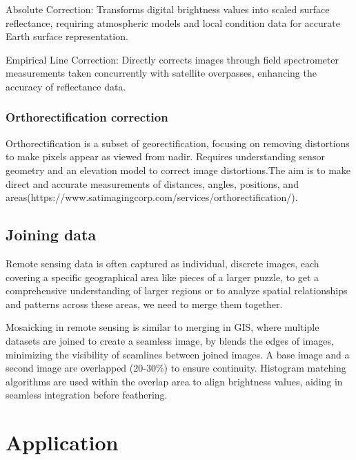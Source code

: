 \documentclass[
  letterpaper,
  DIV=11,
  numbers=noendperiod]{scrreprt}
\begin{document}
Absolute Correction: Transforms digital brightness values into scaled
surface reflectance, requiring atmospheric models and local condition
data for accurate Earth surface representation.

Empirical Line Correction: Directly corrects images through field
spectrometer measurements taken concurrently with satellite overpasses,
enhancing the accuracy of reflectance data.

\subsection{Orthorectification
correction}\label{orthorectification-correction}

Orthorectification is a subset of georectification, focusing on removing
distortions to make pixels appear as viewed from nadir. Requires
understanding sensor geometry and an elevation model to correct image
distortions.The aim is to make direct and accurate measurements of
distances, angles, positions, and
areas(https://www.satimagingcorp.com/services/orthorectification/).

\section{Joining data}\label{joining-data}

Remote sensing data is often captured as individual, discrete images,
each covering a specific geographical area like pieces of a larger
puzzle, to get a comprehensive understanding of larger regions or to
analyze spatial relationships and patterns across these areas, we need
to merge them together.

Mosaicking in remote sensing is similar to merging in GIS, where
multiple datasets are joined to create a seamless image, by blends the
edges of images, minimizing the visibility of seamlines between joined
images. A base image and a second image are overlapped (20-30\%) to
ensure continuity. Histogram matching algorithms are used within the
overlap area to align brightness values, aiding in seamless integration
before feathering.


\chapter{Application}\label{application-1}
\end{document}
